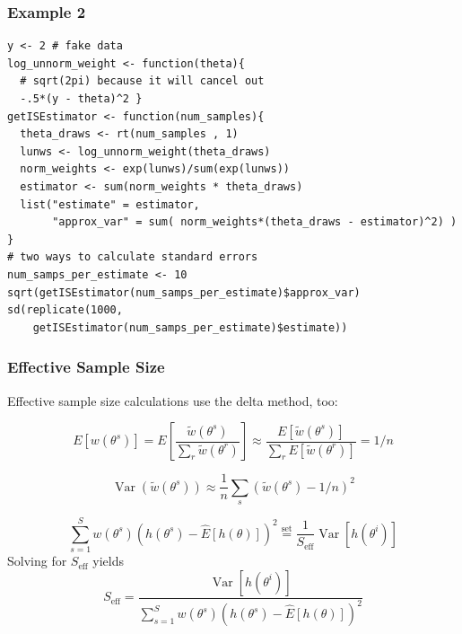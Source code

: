 \documentclass{beamer}
\begin{document}
\begin{frame}[fragile]
\frametitle{Example 2}

\begin{verbatim}
y <- 2 # fake data
log_unnorm_weight <- function(theta){ 
  # sqrt(2pi) because it will cancel out 
  -.5*(y - theta)^2 }
getISEstimator <- function(num_samples){
  theta_draws <- rt(num_samples , 1)
  lunws <- log_unnorm_weight(theta_draws)
  norm_weights <- exp(lunws)/sum(exp(lunws))
  estimator <- sum(norm_weights * theta_draws)
  list("estimate" = estimator, 
       "approx_var" = sum( norm_weights*(theta_draws - estimator)^2) ) }
# two ways to calculate standard errors
num_samps_per_estimate <- 10
sqrt(getISEstimator(num_samps_per_estimate)$approx_var)  
sd(replicate(1000, 
    getISEstimator(num_samps_per_estimate)$estimate)) 
\end{verbatim}


\end{frame}

% 
% 
% 
% 


\begin{frame}[fragile]
\frametitle{Effective Sample Size}

Effective sample size calculations use the delta method, too:
\newline

\[
E[w(\theta^s)] = E\left[\frac{\tilde{w}(\theta^s)}{\sum_r \tilde{w}(\theta^r) } \right] \approx \frac{E[ \tilde{w}(\theta^s)]}{\sum_r E [\tilde{w}(\theta^r)] }  = 1/n
\]

\[
\operatorname{Var}(\tilde{w}(\theta^s)) \approx \frac{1}{n}\sum_s (\tilde{w}(\theta^s) - 1/n)^2
\]

\[
\sum_{s=1}^S w(\theta^s) \left( h(\theta^s) - \hat{E}[h(\theta)]  \right)^2 \overset{\text{set}}{=}  \frac{1}{S_{\text{eff}}} \operatorname{Var}\left[ h(\theta^i) \right]
\]
Solving for $S_{\text{eff}}$ yields
\[
S_{\text{eff}} = \frac{ \operatorname{Var}\left[ h(\theta^i) \right] }{\sum_{s=1}^S w(\theta^s) \left( h(\theta^s) - \hat{E}[h(\theta)]  \right)^2}
\]


\end{frame}
\end{document}
